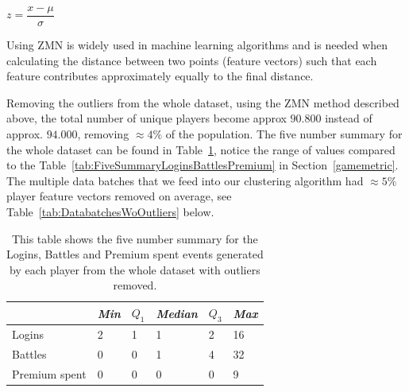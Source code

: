 \begin{center}
$z = \dfrac{x  - \mu}{\sigma}$ 
\end{center}


Using ZMN is widely used in machine learning algorithms and is needed when calculating the distance between two points (feature vectors) such that each feature contributes approximately equally to the final distance.

Removing the outliers from the whole dataset, using the ZMN method described above, the total number of unique players become approx $90.800$ instead of approx. $94.000$, removing $\approx 4\%$ of the population. The five number summary for the whole dataset can be found in Table~\ref{tab:FiveSummaryLoginsBattlesPremiumWoOutliers}, notice the range of values compared to the Table~\ref{tab:FiveSummaryLoginsBattlesPremium} in Section~\ref{gamemetric}. The multiple data batches that we feed into our clustering algorithm had $\approx 5\%$ player feature vectors removed on average, see Table~\ref{tab:DatabatchesWoOutliers} below.

\begin{table}[h]
\centering
\begin{tabular}{| l | l | l | l | l | l |}
    \hline
    & \textit{Min} & $Q_1$ & \textit{Median} & $Q_3$ & \textit{Max} \\ \hline
    Logins & 2 & 1 & 1 & 2 & 16 \\ \hline
    Battles & 0 & 0 & 1 & 4 & 32 \\ \hline
    Premium spent & 0 & 0 & 0 & 0 & 9 \\ \hline
\end{tabular}
\caption{This table shows the five number summary for the Logins, Battles and Premium spent events generated by each player from the whole dataset with outliers removed.}
\label{tab:FiveSummaryLoginsBattlesPremiumWoOutliers}
\end{table}


\begin{table}[h]
\centering
{}
\caption{This table shows the player population, number of outliers found and the percentage of the population removed, for each data batch.}
\label{tab:DatabatchesWoOutliers}
\end{table}



